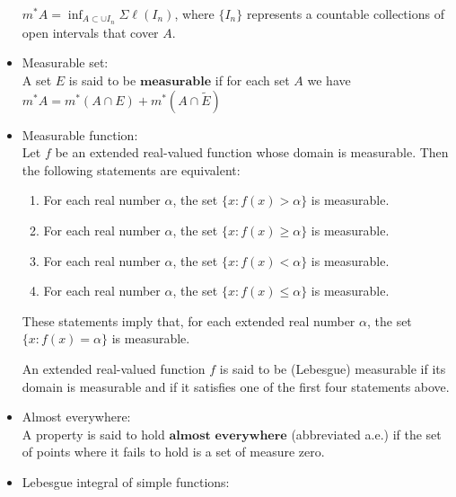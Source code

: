 \documentclass[12pt]{article}
\begin{document}
\begin{itemize}
$m^*A = \inf_{A \subset \cup I_n} \Sigma \ell(I_n)$, where $\{I_n\}$ represents a countable collections of open intervals that cover $A$.
\\
\item Measurable set:\\

A set $E$ is said to be $\textbf{measurable}$ if for each set $A$ we have $m^*A = m^*(A \cap E) + m^*(A \cap \tilde{E})$
\\
\item Measurable function:\\

Let $f$ be an extended real-valued function whose domain is measurable. Then the following statements are equivalent:
\begin{enumerate}
\item For each real number $\alpha$, the set $\{x: f(x) > \alpha\}$ is measurable.
\item For each real number $\alpha$, the set $\{x: f(x) \geq \alpha\}$ is measurable.
\item For each real number $\alpha$, the set $\{x: f(x) < \alpha\}$ is measurable.
\item For each real number $\alpha$, the set $\{x: f(x) \leq \alpha\}$ is measurable.
\end{enumerate}
These statements imply that, for each extended real number $\alpha$, the set $\{x: f(x) = \alpha\}$ is measurable.

An extended real-valued function $f$ is said to be (Lebesgue) measurable if its domain is measurable and if it satisfies one of the first four statements above.
\\
\item Almost everywhere:\\

A property is said to hold $\textbf{almost everywhere}$ (abbreviated a.e.) if the set of points where it fails to hold is a set of measure zero.
\\
\item Lebesgue integral of simple functions:

\end{itemize}
\end{document}
